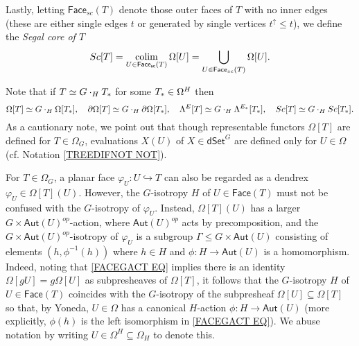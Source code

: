 \documentclass[a4paper,10pt
 ,draft
]{article}%
\begin{document}
Lastly, letting $\mathsf{Face}_{sc}(T)$ denote those outer faces of $T$ with no inner edges (these are either single edges $t$ or generated by single vertices $t^{\uparrow} \leq t$), we define the 
\textit{Segal core of $T$}
\[
	Sc[T] 
= 
	\mathop{\operatorname{colim}}_{U \in 
	\mathsf{Face_{sc}}(T)}
	\Omega[U] 
=
	\bigcup_{U \in 
	\mathsf{Face}_{sc}(T)}
	\Omega[U].
\]

Note that if $T \simeq G \cdot_H T_{\**}$ for some $T_{\**} \in \Omega^H$ then 
\begin{equation}\label{T_DECOMP_EQ}
	\Omega[T] \simeq G \cdot_H \Omega[T_{\**}], 
\quad
	\partial \Omega[T] \simeq G \cdot_H \partial \Omega[T_{\**}], \quad
	\Lambda^{E}[T] \simeq G \cdot_H \Lambda^{E_{\**}}[T_{\**}],
\quad
	Sc[T] \simeq G \cdot_H Sc[T_{\**}].
\end{equation}
As a cautionary note, we point out that though representable functors $\Omega[T]$ are defined for $T \in \Omega_G$,
evaluations $X(U)$ of $X \in \mathsf{dSet}^G$
are defined only for $U \in \Omega$ (cf. Notation \ref{TREEDIFNOT NOT}).

\begin{remark}\label{FACEGACT REM}
	For $T \in \Omega_G$, a planar face $\varphi_U \colon U \hookrightarrow T$
	can also be regarded as a dendrex $\varphi_U \in \Omega[T](U)$.
	However, the $G$-isotropy $H$ of $U \in \mathsf{Face}(T)$ must not be confused with the $G$-isotropy of $\varphi_U$.
	Instead, $\Omega[T](U)$ has a larger $G \times \mathsf{Aut}(U)^{op}$-action,	
	where $\mathsf{Aut}(U)^{op}$ acts by precomposition,
	and the $G \times \mathsf{Aut}(U)^{op}$-isotropy of $\varphi_U$
	is a subgroup 
	$\Gamma \leq G \times \mathsf{Aut}(U)$
	consisting of elements
	$(h,\phi^{-1}(h))$
	where $h\in H$ and
	$\phi\colon H \to \mathsf{Aut}(U)$ is a homomorphism.
	Indeed, noting that \eqref{FACEGACT EQ} implies there is an identity $\Omega[gU] = g \Omega[U]$ as subpresheaves of $\Omega[T]$, it follows that the $G$-isotropy $H$ of $U \in \mathsf{Face}(T)$ coincides with the $G$-isotropy of the subpresheaf $\Omega[U]\subseteq \Omega[T]$ so that, by Yoneda, 
	$U \in \Omega$ has a canonical $H$-action 
	$\phi \colon H \to \mathsf{Aut}(U)$
	(more explicitly, $\phi(h)$ is the left isomorphism in \eqref{FACEGACT EQ}).
	We abuse notation by writing 
	$U \in \Omega^H \subseteq \Omega_H$ to denote this.  
\end{remark}
\end{document}
